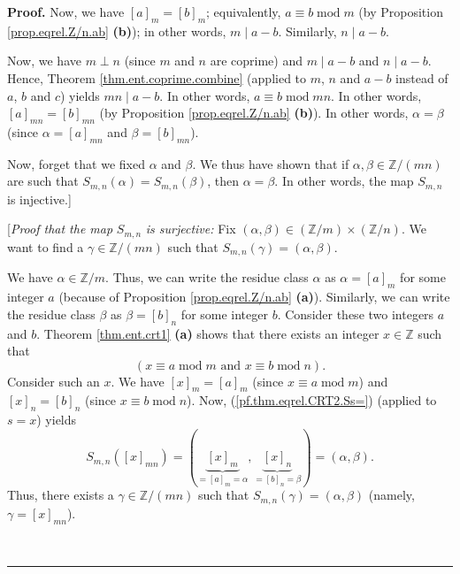 \documentclass[numbers=enddot,12pt,final,onecolumn,notitlepage]{scrartcl}%
\numberwithin{exer}{subsection}
\theoremstyle{definition}
\newenvironment{proof}[1][Proof]{\noindent\textbf{#1.} }{\ \rule{0.5em}{0.5em}}
\begin{document}
\begin{proof}
Now, we have $\left[  a\right]  _{m}=\left[  b\right]  _{m}$; equivalently,
$a\equiv b\operatorname{mod}m$ (by Proposition \ref{prop.eqrel.Z/n.ab}
\textbf{(b)}); in other words, $m\mid a-b$. Similarly, $n\mid a-b$.

Now, we have $m\perp n$ (since $m$ and $n$ are coprime) and $m\mid a-b$ and
$n\mid a-b$. Hence, Theorem \ref{thm.ent.coprime.combine} (applied to $m$, $n$
and $a-b$ instead of $a$, $b$ and $c$) yields $mn\mid a-b$. In other words,
$a\equiv b\operatorname{mod}mn$. In other words, $\left[  a\right]
_{mn}=\left[  b\right]  _{mn}$ (by Proposition \ref{prop.eqrel.Z/n.ab}
\textbf{(b)}). In other words, $\alpha=\beta$ (since $\alpha=\left[  a\right]
_{mn}$ and $\beta=\left[  b\right]  _{mn}$).

Now, forget that we fixed $\alpha$ and $\beta$. We thus have shown that if
$\alpha,\beta\in\mathbb{Z}/\left(  mn\right)  $ are such that $S_{m,n}\left(
\alpha\right)  =S_{m,n}\left(  \beta\right)  $, then $\alpha=\beta$. In other
words, the map $S_{m,n}$ is injective.]

[\textit{Proof that the map }$S_{m,n}$ \textit{is surjective:} Fix $\left(
\alpha,\beta\right)  \in\left(  \mathbb{Z}/m\right)  \times\left(
\mathbb{Z}/n\right)  $. We want to find a $\gamma\in\mathbb{Z}/\left(
mn\right)  $ such that $S_{m,n}\left(  \gamma\right)  =\left(  \alpha
,\beta\right)  $.

We have $\alpha\in\mathbb{Z}/m$. Thus, we can write the residue class $\alpha$
as $\alpha=\left[  a\right]  _{m}$ for some integer $a$ (because of
Proposition \ref{prop.eqrel.Z/n.ab} \textbf{(a)}). Similarly, we can write the
residue class $\beta$ as $\beta=\left[  b\right]  _{n}$ for some integer $b$.
Consider these two integers $a$ and $b$. Theorem \ref{thm.ent.crt1}
\textbf{(a)} shows that there exists an integer $x\in\mathbb{Z}$ such that%
\[
\left(  x\equiv a\operatorname{mod}m\text{ and }x\equiv b\operatorname{mod}%
n\right)  .
\]
Consider such an $x$. We have $\left[  x\right]  _{m}=\left[  a\right]  _{m}$
(since $x\equiv a\operatorname{mod}m$) and $\left[  x\right]  _{n}=\left[
b\right]  _{n}$ (since $x\equiv b\operatorname{mod}n$). Now,
(\ref{pf.thm.eqrel.CRT2.Ss=}) (applied to $s=x$) yields
\[
S_{m,n}\left(  \left[  x\right]  _{mn}\right)  =\left(  \underbrace{\left[
x\right]  _{m}}_{=\left[  a\right]  _{m}=\alpha},\underbrace{\left[  x\right]
_{n}}_{=\left[  b\right]  _{n}=\beta}\right)  =\left(  \alpha,\beta\right)  .
\]
Thus, there exists a $\gamma\in\mathbb{Z}/\left(  mn\right)  $ such that
$S_{m,n}\left(  \gamma\right)  =\left(  \alpha,\beta\right)  $ (namely,
$\gamma=\left[  x\right]  _{mn}$).


\end{proof}
\end{document}
